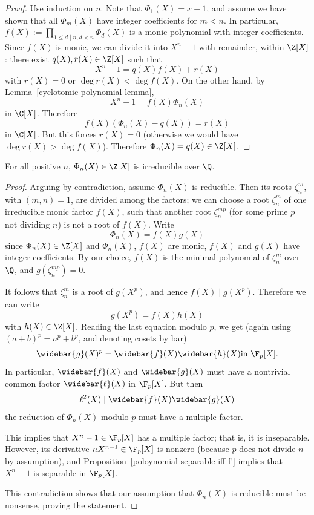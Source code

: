 \begin{proof}
Use induction on $n$. Note that $\Phi_1(X)=x-1$, and assume we have shown that all $\Phi_m(X)$ have integer coefficients for $m<n$. In particular, $f(X):=\prod_{1\leq d\mid n,d<n}\Phi_d(X)$ is a monic polynomial with integer coefficients. Since $f(X)$ is monic, we can divide it into $X^n-1$ with remainder, within $\Z[X]$: there exist $q(X),r(X)\in\Z[X]$ such that
\[X^n-1=q(X)f(X)+r(X)\]
with $r(X)=0$ or $\deg r(X)<\deg f(X)$. On the other hand, by Lemma~\ref{cyclotomic polynomial lemma},
\[X^n-1=f(X)\Phi_n(X)\]
in $\C[X]$. Therefore
\[f(X)(\Phi_n(X)-q(X))=r(X)\]
in $\C[X]$. But this forces $r(X)=0$ (otherwise we would have $\deg r(X)>\deg f(X)$). Therefore $\Phi_n(X)=q(X)\in\Z[X]$.
\end{proof}
\begin{proposition}
For all positive $n$, $\Phi_n(X)\in\Z[X]$ is irreducible over $\Q$.
\end{proposition}
\begin{proof}
Arguing by contradiction, assume $\Phi_n(X)$ is reducible. Then its roots $\zeta_n^m$, with $(m,n)=1$, are divided among the factors; we can choose a root $\zeta^m_n$ of one irreducible monic factor $f(X)$, such that another root $\zeta^{mp}_n$ (for some prime $p$ not dividing $n$) is not a root of $f(X)$. Write 
\[\Phi_n(X)=f(X)g(X)\]
since $\Phi_n(X)\in\Z[X]$ and $\Phi_n(X)$, $f(X)$ are monic, $f(X)$ and $g(X)$ have integer coefficients. By our choice, $f(X)$ is the minimal polynomial of $\zeta^m_n$ over $\Q$, and $g(\zeta^{mp}_n)=0$.\par
It follows that $\zeta^m_n$ is a root of $g(X^p)$, and hence $f(X)\mid g(X^p)$. Therefore we can
write
\[g(X^p)=f(X)h(X)\]
with $h(X)\in\Z[X]$. Reading the last equation modulo $p$, we get (again using $(a+b)^p=a^p+b^p$, and denoting cosets by bar)
\[\widebar{g}(X)^p=\widebar{f}(X)\widebar{h}(X)\text{in }\F_p[X].\]
In particular, $\widebar{f}(X)$ and $\widebar{g}(X)$ must have a nontrivial common factor $\widebar{\ell}(X)$ in $\F_p[X]$. But then
\[\ell^2(X)\mid\widebar{f}(X)\widebar{g}(X)\]
the reduction of $\Phi_n(X)$ modulo $p$ must have a multiple factor.\par
This implies that $X^n-1\in\F_p[X]$ has a multiple factor; that is, it is inseparable. However, its derivative $nX^{n-1}\in\F_p[X]$ is nonzero (because $p$ does not divide $n$ by assumption), and Proposition~\ref{poloynomial separable iff f'} implies that $X^n-1$ is separable in $\F_p[X]$.\par
This contradiction shows that our assumption that $\Phi_n(X)$ is reducible must be nonsense, proving the statement.
\end{proof}
